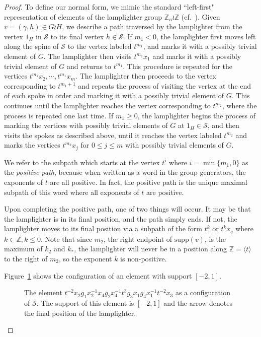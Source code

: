 \documentclass[11pt]{amsart}
\theoremstyle{definition}
\newcommand\Z{\mathbb Z}
\newcommand\support{\mathrm{supp}}
\renewcommand{\geq}{\geqslant} \renewcommand{\leq}{\leqslant} \renewcommand{\ge}{\geqslant} \renewcommand{\le}{\leqslant}
\begin{document}
\begin{proof}
To define our normal form, we
mimic the standard ``left-first" representation of elements of the lamplighter group $\Z_n \wr \Z$ (cf.\   \cite{Taback03}).
Given $v = (\gamma,h) \in G \wr H$, we describe a path traversed by the lamplighter from the vertex $1_H$ in ${\mathcal S}$ to its final vertex $h \in {\mathcal S}$.
If $m_1<0$, the lamplighter first moves left along the spine of ${\mathcal S}$ to the vertex labeled $t^{m_1}$, and marks it with a possibly trivial element of $G$.
The lamplighter then visits $t^{m_1}x_1$ and marks it with a possibly trivial element of $G$ and returns to $t^{m_1}$.
This procedure is repeated for the vertices $t^{m_1}x_2, \cdots ,t^{m_1}x_m$.
The lamplighter then proceeds to the vertex corresponding to $t^{m_1+1}$ and repeats the process of visiting the vertex at the end of each spoke in order and marking it with a possibly trivial element of $G$.
This continues until the lamplighter reaches the vertex corresponding to $t^{m_2}$, where the process is repeated one last time.
If $m_1 \geq 0$, the lamplighter begins the process of marking the vertices with possibly trivial elements of $G$ at $1_H \in {\mathcal S}$, and then visits the spokes as described above, until it reaches the vertex labeled $t^{m_2}$ and marks the vertices $t^{m_2}x_j$ for $0 \leq j \leq m$ with possibly trivial elements of $G$.

We refer to the subpath which starts at the vertex $t^i$ where $i=\min\{m_1,0\}$
as the {\em positive path}, because when written as a word in the group generators, the exponents of $t$ are all positive.
In fact, the positive path is the unique maximal subpath of this word where all exponents of $t$ are positive.




Upon completing the positive path, one of two things will occur.  It may be that the lamplighter is in its final position, and the path simply ends.
If not, the lamplighter moves to its final position via a subpath of the form $t^k$ or  $t^kx_q$ where $k\in \Z, k\leq 0$.
Note that since $m_2$, the right endpoint of $\support(v)$, is the maximum of $k_2$ and $k_*$, the lamplighter will never be in a position along $\Z = \langle t \rangle$ to the right of $m_2$, so the exponent $k$ is non-positive.



Figure~\ref{fig:spine2} shows the configuration of an element with support $[-2,1]$.
\begin{figure}[h!]
  \centering
  
 \caption{The element
 $t^{-2}x_2g_1x_2^{-1}x_4g_2x_4^{-1}t^3g_3x_1g_4x_1^{-1}t^{-2}x_3$
 as a configuration of $\mathcal S$. The support of this element is $[-2,1]$ and the arrow denotes the final position of the lamplighter.}
 \label{fig:spine2}
 \end{figure}







\end{proof}
\end{document}
